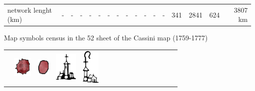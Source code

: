 \documentclass[portrait,a0]{sciposter}
\begin{document}
\begin{minipage}[b]{\textwidth}
\begin{multicols}{3}
\begin{center}
\begin{tabular}{l|cccccccc|c|ccccc|c|r}
        network lenght (km)&-&-&-&-&-&-&-&-&-&-&-&-&\num{341}&\num{2841}&\num{624}&\num{3807} km
      \end{tabular}
    \end{center}
    \vfill
    
    \footnotesize
    \begin{center}
      \captionsetup{type=table}
      \caption{Map symbols census in the 52 sheet of the Cassini map (1759-1777)}\label{tab:symbols}
      \setcellgapes{1pt}
      \begin{tabular}{cccccccccccccccc}
        &
        \includegraphics[height=28pt]{gfx/ville_couleur.png}&
        \includegraphics[height=25pt]{gfx/bourg_couleur.png}&
        \includegraphics[height=40pt]{gfx/village.pdf}&
        \includegraphics[height=49pt]{gfx/abbaye.pdf}&

\end{tabular}
\end{center}
\end{multicols}
\end{minipage}
\end{document}
